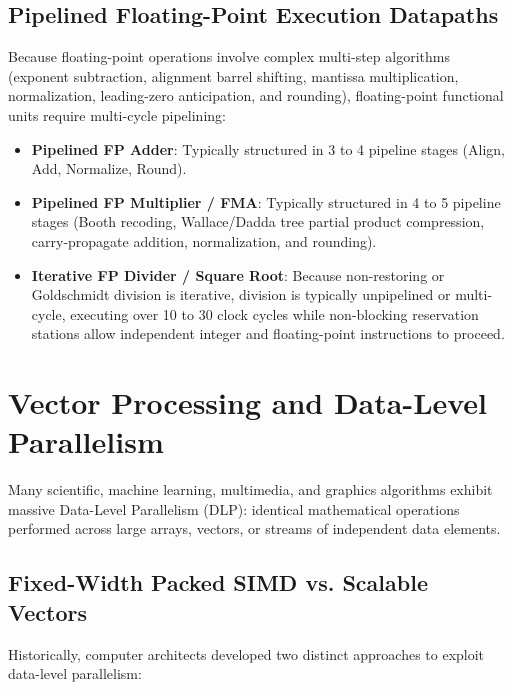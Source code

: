 \subsection{Pipelined Floating-Point Execution Datapaths}
Because floating-point operations involve complex multi-step algorithms (exponent subtraction, alignment barrel shifting, mantissa multiplication, normalization, leading-zero anticipation, and rounding), floating-point functional units require multi-cycle pipelining:
\begin{itemize}
    \item \textbf{Pipelined FP Adder}: Typically structured in 3 to 4 pipeline stages (Align, Add, Normalize, Round).
    \item \textbf{Pipelined FP Multiplier / FMA}: Typically structured in 4 to 5 pipeline stages (Booth recoding, Wallace/Dadda tree partial product compression, carry-propagate addition, normalization, and rounding).
    \item \textbf{Iterative FP Divider / Square Root}: Because non-restoring or Goldschmidt division is iterative, division is typically unpipelined or multi-cycle, executing over 10 to 30 clock cycles while non-blocking reservation stations allow independent integer and floating-point instructions to proceed.
\end{itemize}


\section{Vector Processing and Data-Level Parallelism}\label{sec:vector_processing}

Many scientific, machine learning, multimedia, and graphics algorithms exhibit massive Data-Level Parallelism (DLP): identical mathematical operations performed across large arrays, vectors, or streams of independent data elements.

\subsection{Fixed-Width Packed SIMD vs. Scalable Vectors}
Historically, computer architects developed two distinct approaches to exploit data-level parallelism:

